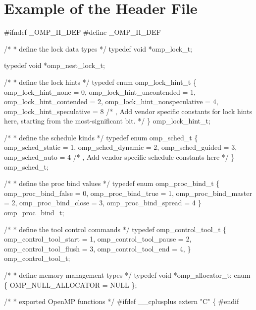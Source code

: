 \pagebreak
\section{Example of the  Header File}
\label{sec:Example of the omp.h Header File}
{\small \begin{codepar}
\#ifndef \_OMP\_H\_DEF
\#define \_OMP\_H\_DEF

/*
 * define the lock data types
 */
typedef void *omp\_lock\_t;

typedef void *omp\_nest\_lock\_t;

/*
 * define the lock hints
 */
typedef enum omp\_lock\_hint\_t 
\{
 omp\_lock\_hint\_none = 0,
 omp\_lock\_hint\_uncontended = 1,
 omp\_lock\_hint\_contended = 2,
 omp\_lock\_hint\_nonspeculative = 4,
 omp\_lock\_hint\_speculative = 8
/* , Add vendor specific constants for lock hints here,
   starting from the most-significant bit. */
\} omp\_lock\_hint\_t;

/*
 * define the schedule kinds
 */
typedef enum omp\_sched\_t
\{
 omp\_sched\_static = 1,
 omp\_sched\_dynamic = 2,
 omp\_sched\_guided = 3,
 omp\_sched\_auto = 4
/* , Add vendor specific schedule constants here */
\} omp\_sched\_t;

/*
* define the proc bind values 
*/ 
typedef enum omp\_proc\_bind\_t
\{
 omp\_proc\_bind\_false = 0,
 omp\_proc\_bind\_true = 1,
 omp\_proc\_bind\_master = 2,
 omp\_proc\_bind\_close = 3,
 omp\_proc\_bind\_spread = 4
\} omp\_proc\_bind\_t; 
\begin{samepage}
/*
 * define the tool control commands 
 */
typedef omp\_control\_tool\_t 
\{
  omp\_control\_tool\_start = 1,
  omp\_control\_tool\_pause = 2,
  omp\_control\_tool\_flush = 3,
  omp\_control\_tool\_end = 4,
\} omp\_control\_tool\_t;
\end{samepage}

/*
 * define memory management types
 */
typedef void *omp\_allocator\_t;
enum \{ OMP\_NULL\_ALLOCATOR = NULL \};

/*
 * exported OpenMP functions
 */
\#ifdef _\_cplusplus
extern "C"
\{
\#endif


\end{codepar}}
